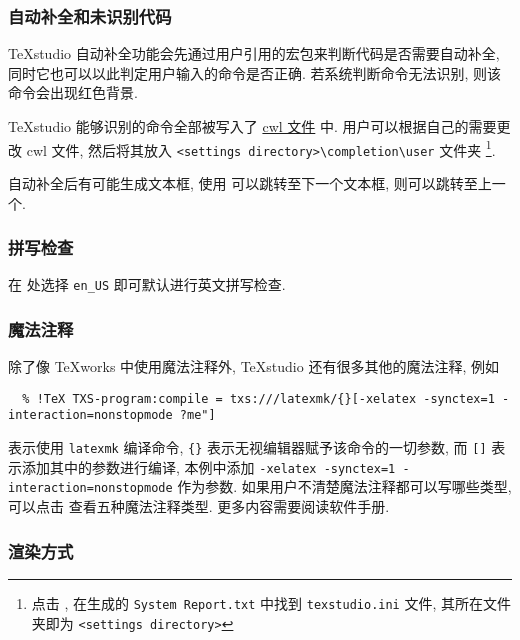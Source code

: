 \subsubsection{自动补全和未识别代码}

\TeX studio 自动补全功能会先通过用户引用的宏包来判断代码是否需要自动补全, 
同时它也可以以此判定用户输入的命令是否正确.
若系统判断命令无法识别,
则该命令会出现红色背景.

\TeX studio 能够识别的命令全部被写入了
\href{https://github.com/texstudio-org/texstudio/tree/master/completion}{cwl 文件}
中. 
用户可以根据自己的需要更改 cwl 文件,
然后将其放入
\texttt{<settings directory>\textbackslash completion\textbackslash user}
文件夹%
\footnote{点击 ,
在生成的 \texttt{System Report.txt} 中找到 \texttt{texstudio.ini} 文件,
其所在文件夹即为 \texttt{<settings directory>}}. 

自动补全后有可能生成文本框,
使用 \keys{\ctrl + \arrowkey{>}} 可以跳转至下一个文本框,
\keys{\ctrl + \arrowkey{<}} 则可以跳转至上一个. 

\subsubsection{拼写检查}

在
处选择 \texttt{en\_US} 即可默认进行英文拼写检查.

\subsubsection{魔法注释}

除了像 \TeX works 中使用魔法注释外, \TeX studio 还有很多其他的魔法注释, 例如
\begin{lstlisting}
  % !TeX TXS-program:compile = txs:///latexmk/{}[-xelatex -synctex=1 -interaction=nonstopmode ?me"]
\end{lstlisting}
表示使用 \texttt{latexmk} 编译命令,
\texttt{\{\}} 表示无视编辑器赋予该命令的一切参数,
而 \texttt{[]} 表示添加其中的参数进行编译,
本例中添加 \texttt{-xelatex -synctex=1 -interaction=nonstopmode} 作为参数.
如果用户不清楚魔法注释都可以写哪些类型,
可以点击  查看五种魔法注释类型.
更多内容需要阅读软件手册.

\subsubsection{渲染方式}


